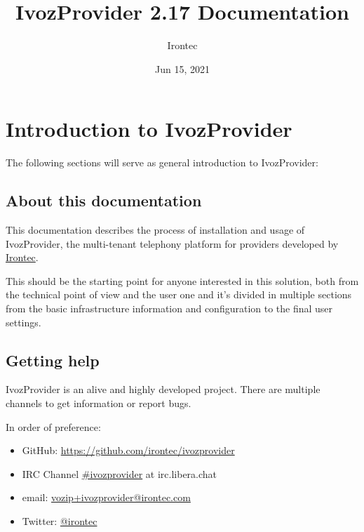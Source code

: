\documentclass[letterpaper,10pt,english]{sphinxmanual}
\title{IvozProvider 2.17 Documentation}
\date{Jun 15, 2021}
\author{Irontec}
\begin{document}
\maketitle
\tableofcontents
{}\label{index::doc}



\chapter{Introduction to IvozProvider}
\label{basic_concepts/intro/index::doc}\label{basic_concepts/intro/index:introduction-to-ivozprovider}\label{basic_concepts/intro/index:ivozprovider-official-documentation}
The following sections will serve as general introduction to IvozProvider:


\section{About this documentation}
\label{basic_concepts/intro/about::doc}\label{basic_concepts/intro/about:about-this-documentation}
This documentation describes the process of installation and usage of
IvozProvider, the multi-tenant telephony platform for providers developed
by \href{http://irontec.com}{Irontec}.

This should be the starting point for anyone interested in this solution,
both from the technical point of view and the user one and it's divided
in multiple sections from the basic infrastructure information and configuration
to the final user settings.


\section{Getting help}
\label{basic_concepts/intro/getting_help:getting-help}\label{basic_concepts/intro/getting_help::doc}\label{basic_concepts/intro/getting_help:id1}
IvozProvider is an alive and highly developed project. There are
multiple channels to get information or report bugs.

In order of preference:
\begin{itemize}
\item {} 
GitHub: \url{https://github.com/irontec/ivozprovider}

\item {} 
IRC Channel \href{https://kiwiirc.com/nextclient/irc.libera.chat/\#ivozprovider}{\#ivozprovider} at irc.libera.chat

\item {} 
email: \href{mailto:vozip+ivozprovider@irontec.com}{vozip+ivozprovider@irontec.com}

\item {} 
Twitter: \href{https://twitter.com/irontec}{@irontec}

\end{itemize}
\end{document}
